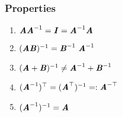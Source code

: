\subsubsection{Properties}

\begin{multicols}{2}
\begin{enumerate}
    \item $\text{\textbf{\textit{A}}}\text{\textbf{\textit{A}}}^{-1} = \text{\textbf{\textit{I}}} = \text{\textbf{\textit{A}}}^{-1}\text{\textbf{\textit{A}}}$
    \hfill \cite{mfml/book/mml/Deisenroth-Faisal-Ong}

    \item $(\text{\textbf{\textit{A}}}\text{\textbf{\textit{B}}})^{-1} = \text{\textbf{\textit{B}}}^{-1}\ \text{\textbf{\textit{A}}}^{-1}$
    \hfill \cite{mfml/book/mml/Deisenroth-Faisal-Ong}

    \item $(\text{\textbf{\textit{A}}} + \text{\textbf{\textit{B}}})^{-1} \neq \text{\textbf{\textit{A}}}^{-1} + \text{\textbf{\textit{B}}}^{-1}$
    \hfill \cite{mfml/book/mml/Deisenroth-Faisal-Ong}

    \item $(\text{\textbf{\textit{A}}}^{-1})^\top = (\text{\textbf{\textit{A}}}^\top)^{-1} =: \text{\textbf{\textit{A}}}^{-\top}$
    \hfill \cite{mfml/book/mml/Deisenroth-Faisal-Ong}

    \item $(\text{\textbf{\textit{A}}}^{-1})^{-1} =  \text{\textbf{\textit{A}}}$
    
\end{enumerate}
\end{multicols}

